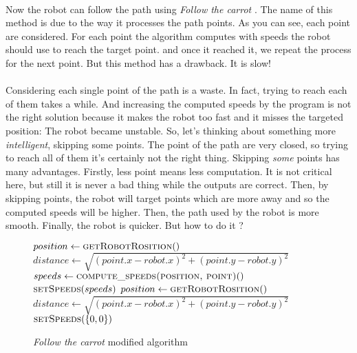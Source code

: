 \paragraph{}{
   Now the robot can follow the path using \textit{Follow the carrot}
 \cite{thesis:barton}. The name of this method is due to the way it processes
 the path points. As you can see, each point are considered. For each point the
 algorithm computes with speeds the robot should use to reach the target point.
 and once it reached it, we repeat the process for the next point. But this
 method has a drawback. It is slow!
}

\paragraph{}{
    Considering each single point of the path is a waste. In fact, trying to
 reach each of them takes a while. And increasing the computed speeds by the
 program is not the right solution because it makes the robot too fast and it
 misses the targeted position: The robot became unstable. So, let's thinking
 about something more \textit{intelligent}, skipping some points. \newline
 The point of the path are very closed, so trying to reach all of them it's
 certainly not the right thing. Skipping \textit{some} points has many
 advantages. Firstly, less point means less computation. It is not critical  
 here, but still it is never a bad thing while the outputs are correct. Then, by
 skipping points, the robot will target points which are more away and so the
 computed speeds will be higher. Then, the path used by the robot is more
 smooth. Finally, the robot is quicker. But how to do it ?
}

\begin{figure}[!h]
    \begin{algorithmic}
            \State $position \gets \Call{getRobotRosition}$
            \State $distance \gets \sqrt{(point.x - robot.x)^{2} + (point.y - robot.y)^{2}}$
                    \State $speeds \gets \Call{compute\_speeds(position, point)}$
                    \State $\Call{setSpeeds}{speeds}$
                    \State $position \gets \Call{getRobotRosition}$
                    \State $distance \gets \sqrt{(point.x - robot.x)^{2} + (point.y - robot.y)^{2}}$
                \EndWhile
            \EndIf
        \EndFor
        \State $\Call{setSpeeds}{\{ 0, 0\}}$
    \end{algorithmic}
    
    \caption{
        \label{algo:v2}
        \textit{Follow the carrot} modified algorithm
    }
\end{figure}

